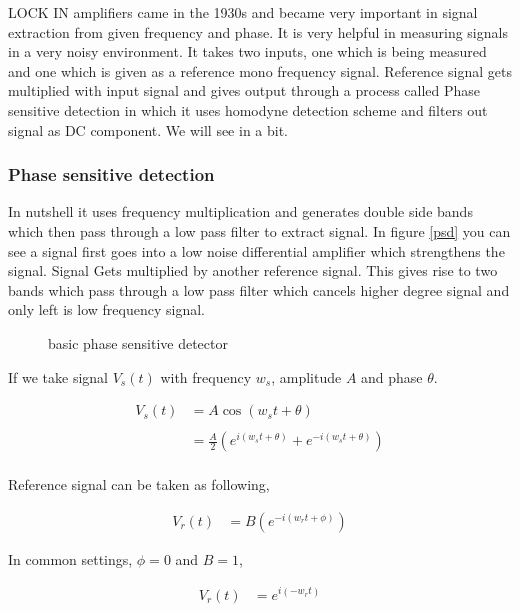 LOCK IN amplifiers came in the 1930s and became very important in signal extraction from given frequency and phase. It is very helpful in measuring signals in a very noisy environment. It takes two inputs, one which is being measured and one which is given as a reference mono frequency signal. Reference signal gets multiplied with input signal and gives output through a process called Phase sensitive detection in which it uses homodyne detection scheme and filters out signal as DC component. We will see in a bit.\cite{srssr830}\cite{thinksrslockin}\cite{zhistpricipleoflockin}\cite{srssr830m}

\subsubsection{Phase sensitive detection}

In nutshell it uses frequency multiplication and generates double side bands which then pass through a low pass filter to extract signal. In figure \ref{psd} you can see a signal first goes into a low noise differential amplifier which strengthens the signal. Signal Gets multiplied by another reference signal. This gives rise to two bands which pass through a low pass filter which cancels higher degree signal and only left is low frequency signal.


\begin{figure}[hbt!]
\caption{basic phase sensitive detector}
\end{figure}

If we take signal $V_s(t)$ with frequency $w_s$, amplitude $A$ and phase $\theta$. 

\begin{align*}
V_{s}(t) & = A \cos(w_st+\theta)\\
\\
& = \frac{A}{2} (e^{i(w_st+\theta)}+e^{-i(w_st+\theta)})\\
\end{align*}

Reference signal can be taken as following,

\begin{align*}
V_r(t) & = B (e^{-i(w_rt+\phi)})
\end{align*}

In common settings, $\phi = 0$ and $B=1$,

\begin{align*}
V_r(t) & = e^{i(-w_rt)}
\end{align*}

